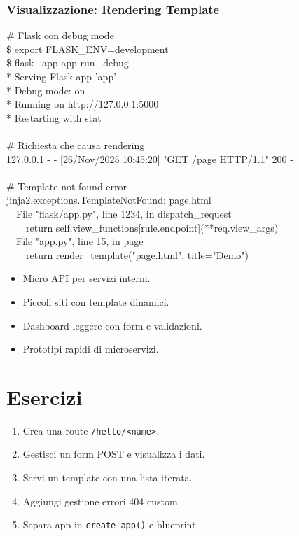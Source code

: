\subsubsection{Visualizzazione: Rendering Template}
\begin{tcolorbox}[title=Output Terminale: Template Rendering, colback=black, coltext=green!80, fontupper=\ttfamily\small]
\# Flask con debug mode\\
\$ export FLASK\_ENV=development\\
\$ flask --app app run --debug\\
* Serving Flask app 'app'\\
* Debug mode: on\\
* Running on http://127.0.0.1:5000\\
* Restarting with stat\\
\\
\# Richiesta che causa rendering\\
127.0.0.1 - - [26/Nov/2025 10:45:20] "GET /page HTTP/1.1" 200 -\\
\\
\# Template not found error\\
jinja2.exceptions.TemplateNotFound: page.html\\
\ \ File "flask/app.py", line 1234, in dispatch\_request\\
\ \ \ \ return self.view\_functions[rule.endpoint](**req.view\_args)\\
\ \ File "app.py", line 15, in page\\
\ \ \ \ return render\_template("page.html", title="Demo")
\end{tcolorbox}

\begin{tcolorbox}[title=Casi d'uso]
\begin{itemize}
  \item Micro API per servizi interni.
  \item Piccoli siti con template dinamici.
  \item Dashboard leggere con form e validazioni.
  \item Prototipi rapidi di microservizi.
\end{itemize}
\end{tcolorbox}

\section{Esercizi}
\begin{enumerate}
  \item Crea una route \texttt{/hello/<name>}.
  \item Gestisci un form POST e visualizza i dati.
  \item Servi un template con una lista iterata.
  \item Aggiungi gestione errori 404 custom.
  \item Separa app in \texttt{create\_app()} e blueprint.
\end{enumerate}

